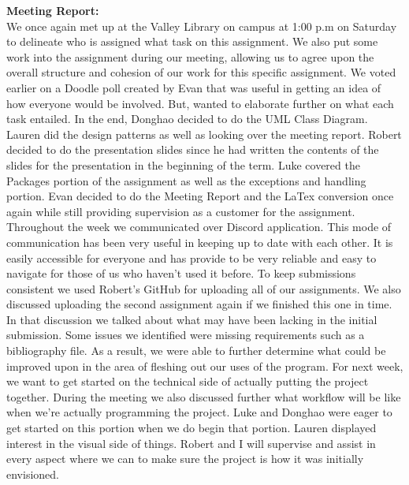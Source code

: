 \documentclass[12pt, letterpaper]{article}
\begin{document}
\textbf{Meeting Report:}
\\We once again met up at the Valley Library on campus at 1:00 p.m on Saturday to delineate who is assigned what task on this assignment. We also put some work into the assignment during our meeting, allowing us to agree upon the overall structure and cohesion of our work for this specific assignment. We voted earlier on a Doodle poll created by Evan that was useful in getting an idea of how everyone would be involved. But, wanted to elaborate further on what each task entailed. In the end, Donghao decided to do the UML Class Diagram. Lauren did the design patterns as well as looking over the meeting report. Robert decided to do the presentation slides since he had written the contents of the slides for the presentation in the beginning of the term. Luke covered the Packages portion of the assignment as well as the exceptions and handling portion. Evan decided to do the Meeting Report and the LaTex conversion once again while still providing supervision as a customer for the assignment. 
Throughout the week we communicated over Discord application. This mode of communication has been very useful in keeping up to date with each other. It is easily accessible for everyone and has provide to be very reliable and easy to navigate for those of us who haven’t used it before. To keep submissions consistent we used Robert’s GitHub for uploading all of our assignments. We also discussed uploading the second assignment again if we finished this one in time. In that discussion we talked about what may have been lacking in the initial submission.  Some issues we identified were missing requirements such as a bibliography file.  As a result, we were able to further determine what could be improved upon in the area of fleshing out our uses of the program. 
For next week, we want to get started on the technical side of actually putting the project together. During the meeting we also discussed further what workflow will be like when we’re actually programming the project. Luke and Donghao were eager to get started on this portion when we do begin that portion. Lauren displayed interest in the visual side of things. Robert and I will supervise and assist in every aspect where we can to make sure the project is how it was initially envisioned.
\end{document}
